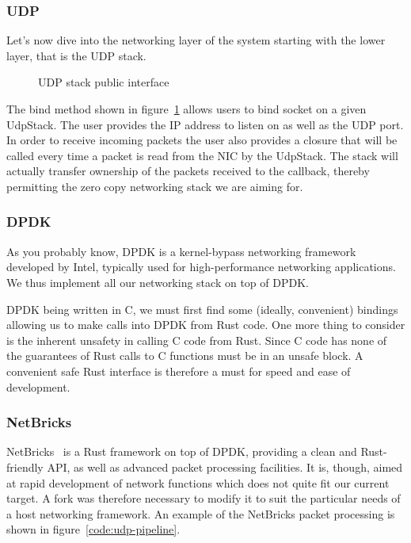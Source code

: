 \documentclass[11pt]{book}
\begin{document}
\subsubsection{UDP}

Let's now dive into the networking layer of the system starting with
the lower layer, that is the UDP stack.

\begin{figure}[htb!]
  
  \label{code:socket-registration}
  \caption{UDP stack public interface}
\end{figure}

The bind method shown in figure~\ref{code:socket-registration} allows
users to bind socket on a given UdpStack. The user provides the IP
address to listen on as well as the UDP port. In order to receive
incoming packets the user also provides a closure that will be called
every time a packet is read from the NIC by the UdpStack. The stack
will actually transfer ownership of the packets received to the
callback, thereby permitting the zero copy networking stack we are
aiming for.

\subsubsection{DPDK}

As you probably know, DPDK is a kernel-bypass networking framework
developed by Intel, typically used for high-performance networking
applications. We thus implement all our networking stack on top of
DPDK.

DPDK being written in C, we must first find some (ideally, convenient)
bindings allowing us to make calls into DPDK from Rust code. One more
thing to consider is the inherent unsafety in calling C code from
Rust. Since C code has none of the guarantees of Rust calls to C
functions must be in an unsafe block. A convenient safe Rust interface
is therefore a must for speed and ease of development.

\subsubsection{NetBricks}
NetBricks~\cite{netbricks} is a Rust framework on top of DPDK,
providing a clean and Rust-friendly API, as well as advanced packet
processing facilities. It is, though, aimed at rapid development of
network functions which does not quite fit our current target. A fork
was therefore necessary to modify it to suit the particular needs of a
host networking framework. An example of the NetBricks packet
processing is shown in figure~\ref{code:udp-pipeline}.
\end{document}
